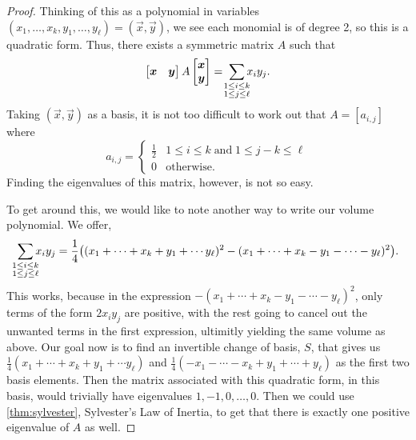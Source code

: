 \documentclass[12pt,oneside]{../../sfsuthesis}
\begin{document}
\begin{proof}
    Thinking of this as a polynomial in variables \( (x_1, \dots, x_k, y_1, \dots, y_\ell) = (\vec{x}, \vec{y}) \), we see each monomial is of degree 2, so this is a quadratic form.
    Thus, there exists a symmetric matrix \( A \) such that
    \[
        \begin{bmatrix}
            \vec{x} & \vec{y}
        \end{bmatrix}
        A
        \begin{bmatrix}
            \vec{x} \\ \vec{y}
        \end{bmatrix}
        = \; \sum_{\mathclap{\substack{1 \leq i \leq k \\ 1 \leq j \leq \ell}}} x_i y_j.
    \]
    Taking \( (\vec{x}, \vec{y}) \) as a basis, it is not too difficult to work out that \( A = [a_{i,j}] \) where
    \[
        a_{i,j} =
        \begin{cases}
            \frac{1}{2} & 1 \leq i \leq k \;\text{and} \; 1 \leq j - k \leq \ell \\
            0           & \text{otherwise}.
        \end{cases}
    \]
    Finding the eigenvalues of this matrix, however, is not so easy.

    To get around this, we would like to note another way to write our volume polynomial.
    We offer,
    \[
        \sum_{\mathclap{\substack{1 \leq i \leq k \\ 1 \leq j \leq \ell}}} x_i y_j
        = \frac{1}{4} \big((x_1 + \cdots + x_k + y_1 + \cdots y_\ell)^2 - (x_1 + \cdots + x_k - y_1 - \cdots - y_\ell)^2\big).
    \]
    This works, because in the expression \( -(x_1 + \cdots + x_k - y_1 - \cdots - y_\ell)^2 \), only terms of the form \( 2x_i y_j \) are positive, with the rest going to cancel out the unwanted terms in the first expression, ultimitly yielding the same volume as above.
    Our goal now is to find an invertible change of basis, \( S \), that gives us \( \frac{1}{4}(x_1 + \cdots + x_k + y_1 + \cdots y_\ell) \) and \( \frac{1}{4}(-x_1 - \cdots - x_k + y_1 + \cdots + y_\ell) \) as the first two basis elements.
    Then the matrix associated with this quadratic form, in this basis, would trivially have eigenvalues \( 1, -1, 0, \dots, 0 \).
    Then we could use \th\ref{thm:sylvester}, Sylvester's Law of Inertia, to get that there is exactly one positive eigenvalue of \( A \) as well.


\end{proof}
\end{document}

